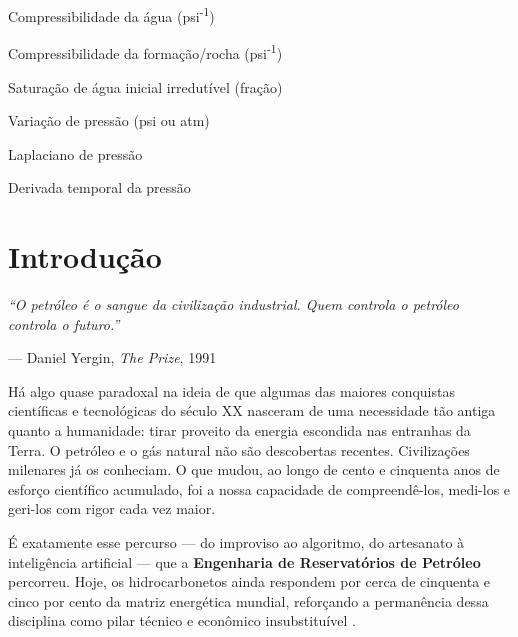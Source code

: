 \documentclass[
  12pt,
  a4paper,
  oneside,
  brazilian,
  sumario=tradicional
]{abntex2}
\begin{document}
\begin{simbolos}
  \item[$c_w$]                   Compressibilidade da água (psi\textsuperscript{-1})
  \item[$c_f$]                   Compressibilidade da formação/rocha (psi\textsuperscript{-1})
  \item[$S_{wi}$]                Saturação de água inicial irredutível (fração)
  \item[$\Delta P$]              Variação de pressão (psi ou atm)
  \item[$\nabla^2 P$]            Laplaciano de pressão
  \item[$\partial P/\partial t$] Derivada temporal da pressão
\end{simbolos}

\tableofcontents*

\textual

\chapter{Introdução}
\label{chap:introducao}

\epigraph{\textit{``O petróleo é o sangue da civilização industrial.
Quem controla o petróleo controla o futuro.''}}{--- Daniel Yergin,
\textit{The Prize}, 1991}

Há algo quase paradoxal na ideia de que algumas das maiores conquistas
científicas e tecnológicas do século XX nasceram de uma necessidade tão
antiga quanto a humanidade: tirar proveito da energia escondida nas
entranhas da Terra. O petróleo e o gás natural não são descobertas
recentes. Civilizações milenares já os conheciam. O que mudou, ao longo
de cento e cinquenta anos de esforço científico acumulado, foi a nossa
capacidade de compreendê-los, medi-los e geri-los com rigor
cada vez maior.

É exatamente esse percurso — do improviso ao algoritmo, do artesanato
à inteligência artificial — que a \textbf{Engenharia de Reservatórios
de Petróleo} percorreu. Hoje, os hidrocarbonetos ainda respondem por
cerca de cinquenta e cinco por cento da matriz energética mundial,
reforçando a permanência dessa disciplina como pilar técnico e
econômico insubstituível \cite{ahmed2010, terry2015}.
\end{document}
